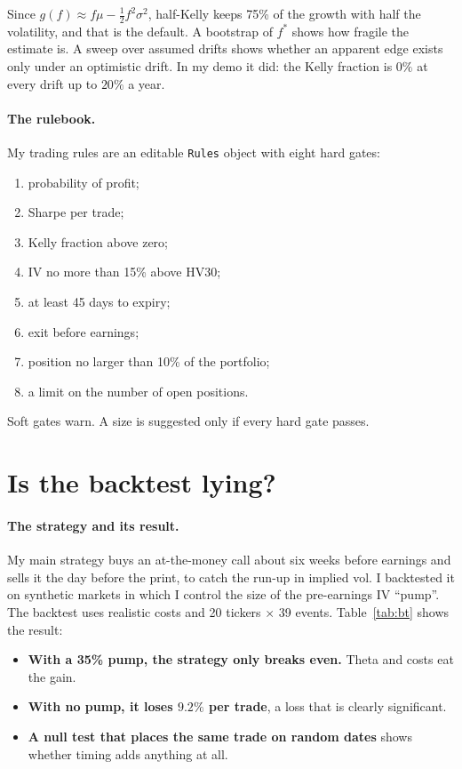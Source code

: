 \documentclass[11pt,a4paper]{article}
\begin{document}
Since $g(f)\approx f\mu - \frac12f^2\sigma^2$, half-Kelly keeps 75\% of the growth with half the volatility, and that is the default. A bootstrap of $f^*$ shows how fragile the estimate is. A sweep over assumed drifts shows whether an apparent edge exists only under an optimistic drift. In my demo it did: the Kelly fraction is $0\%$ at every drift up to $20\%$ a year.

\paragraph{The rulebook.} My trading rules are an editable \texttt{Rules} object with eight hard gates:
\begin{enumerate}[leftmargin=1.5em]
  \item probability of profit;
  \item Sharpe per trade;
  \item Kelly fraction above zero;
  \item IV no more than 15\% above HV30;
  \item at least 45 days to expiry;
  \item exit before earnings;
  \item position no larger than 10\% of the portfolio;
  \item a limit on the number of open positions.
\end{enumerate}
Soft gates warn. A size is suggested only if every hard gate passes.

\section{Is the backtest lying?}
\paragraph{The strategy and its result.} My main strategy buys an at-the-money call about six weeks before earnings and sells it the day before the print, to catch the run-up in implied vol. I backtested it on synthetic markets in which I control the size of the pre-earnings IV ``pump''. The backtest uses realistic costs and 20 tickers $\times$ 39 events. Table~\ref{tab:bt} shows the result:
\begin{itemize}[leftmargin=1.5em]
  \item \textbf{With a 35\% pump, the strategy only breaks even.} Theta and costs eat the gain.
  \item \textbf{With no pump, it loses $9.2\%$ per trade}, a loss that is clearly significant.
  \item \textbf{A null test that places the same trade on random dates} shows whether timing adds anything at all.
\end{itemize}
\end{document}

